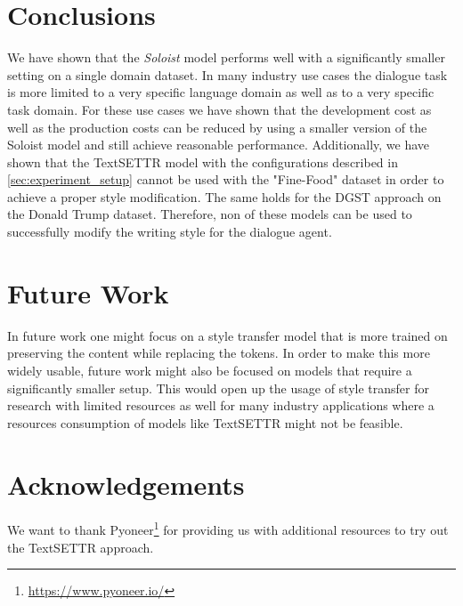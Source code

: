 \documentclass[twocolumn]{tum-article}
\begin{document}
\section{Conclusions}
We have shown that the \textit{Soloist} model performs well with a significantly smaller setting on a single domain dataset. In many industry use cases the dialogue task is more limited to a very specific language domain as well as to a very specific task domain. For these use cases we have shown that the development cost as well as the production costs can be reduced by using a smaller version of the Soloist model and still achieve reasonable performance. Additionally, we have shown that the TextSETTR model with the configurations described in \autoref{sec:experiment_setup} cannot be used with the "Fine-Food" dataset in order to achieve a proper style modification. The same holds for the DGST approach on the Donald Trump dataset. Therefore, non of these models can be used to successfully modify the writing style for the dialogue agent.
\section{Future Work}
In future work one might focus on a style transfer model that is more trained on preserving the content while replacing the tokens. In order to make this more widely usable, future work might also be focused on models that require a significantly smaller setup. This would open up the usage of style transfer for research with limited resources as well for many industry applications where a resources consumption of models like TextSETTR might not be feasible.
\section*{Acknowledgements}
We want to thank Pyoneer\footnote{\url{https://www.pyoneer.io/}} for providing us with additional resources to try out the TextSETTR approach. 


\end{document}
